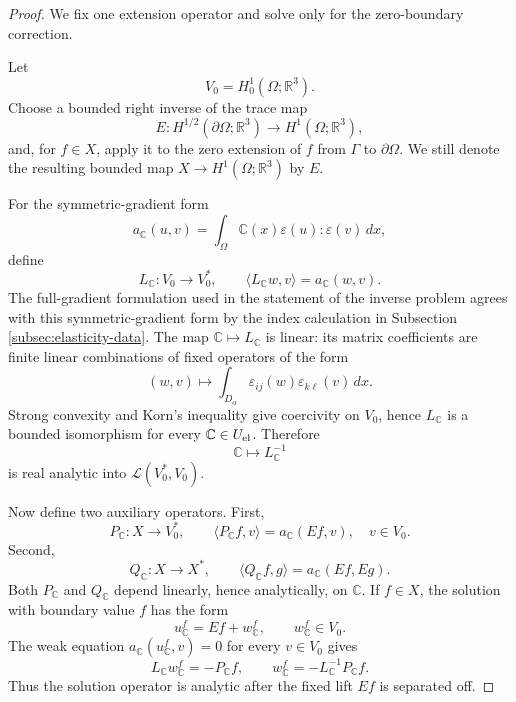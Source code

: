 \documentclass[12pt,oneside]{amsart}
\newcommand{\R}{\mathbb R}
\newcommand{\cL}{\mathcal L}
\newcommand{\dual}[2]{\langle #1,#2\rangle}
\begin{document}
\begin{proof}
We fix one extension operator and solve only for the zero-boundary correction.

Let
\[
        V_0=H^1_0(\Omega;\R^3).
\]
Choose a bounded right inverse of the trace map
\[
        E:H^{1/2}(\partial\Omega;\R^3)\to H^1(\Omega;\R^3),
\]
and, for $f\in X$, apply it to the zero extension of $f$ from $\Gamma$ to $\partial\Omega$.  We still denote the resulting bounded map $X\to H^1(\Omega;\R^3)$ by $E$.

For the symmetric-gradient form
\[
        a_{\mathbb C}(u,v)=
        \int_\Omega \mathbb C(x)\varepsilon(u):\varepsilon(v)\,dx,
\]
define
\[
        L_{\mathbb C}:V_0\to V_0^*,
        \qquad
        \dual{L_{\mathbb C}w}{v}=a_{\mathbb C}(w,v).
\]
The full-gradient formulation used in the statement of the inverse problem agrees with this symmetric-gradient form by the index calculation in Subsection \ref{subsec:elasticity-data}.  The map $\mathbb C\mapsto L_{\mathbb C}$ is linear: its matrix coefficients are finite linear combinations of fixed operators of the form
\[
        (w,v)\mapsto
        \int_{D_\alpha}\varepsilon_{ij}(w)\varepsilon_{k\ell}(v)\,dx .
\]
Strong convexity and Korn's inequality give coercivity on $V_0$, hence $L_{\mathbb C}$ is a bounded isomorphism for every $\mathbb C\in U_{\rm el}$.  Therefore
\[
        \mathbb C\mapsto L_{\mathbb C}^{-1}
\]
is real analytic into $\cL(V_0^*,V_0)$.

Now define two auxiliary operators.  First,
\[
        P_{\mathbb C}:X\to V_0^*,
        \qquad
        \dual{P_{\mathbb C}f}{v}=a_{\mathbb C}(Ef,v),
        \quad v\in V_0 .
\]
Second,
\[
        Q_{\mathbb C}:X\to X^*,
        \qquad
        \dual{Q_{\mathbb C}f}{g}=a_{\mathbb C}(Ef,Eg).
\]
Both $P_{\mathbb C}$ and $Q_{\mathbb C}$ depend linearly, hence analytically, on $\mathbb C$.  If $f\in X$, the solution with boundary value $f$ has the form
\[
        u_{\mathbb C}^f=Ef+w_{\mathbb C}^f,
        \qquad w_{\mathbb C}^f\in V_0.
\]
The weak equation $a_{\mathbb C}(u_{\mathbb C}^f,v)=0$ for every $v\in V_0$ gives
\[
        L_{\mathbb C}w_{\mathbb C}^f=-P_{\mathbb C}f,
        \qquad
        w_{\mathbb C}^f=-L_{\mathbb C}^{-1}P_{\mathbb C}f.
\]
Thus the solution operator is analytic after the fixed lift $Ef$ is separated off.


\end{proof}
\end{document}
